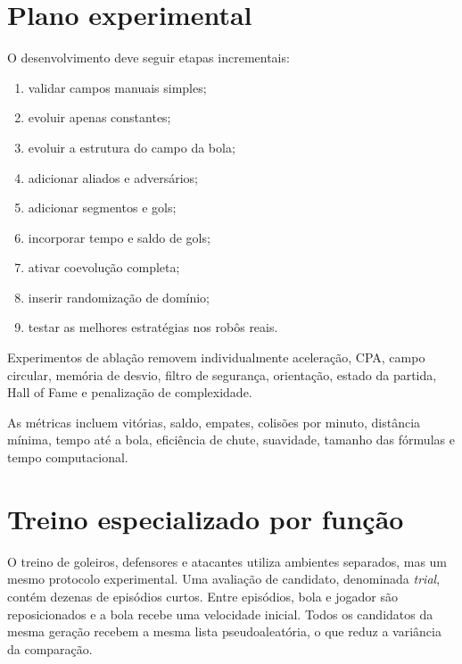 \documentclass[12pt,a4paper]{article}
\begin{document}
\section{Plano experimental}

O desenvolvimento deve seguir etapas incrementais:

\begin{enumerate}
  \item validar campos manuais simples;
  \item evoluir apenas constantes;
  \item evoluir a estrutura do campo da bola;
  \item adicionar aliados e advers\'arios;
  \item adicionar segmentos e gols;
  \item incorporar tempo e saldo de gols;
  \item ativar coevolu\c{c}\~ao completa;
  \item inserir randomiza\c{c}\~ao de dom\'inio;
  \item testar as melhores estrat\'egias nos rob\^os reais.
\end{enumerate}

Experimentos de abla\c{c}\~ao removem individualmente acelera\c{c}\~ao, CPA, campo circular, mem\'oria de desvio, filtro de seguran\c{c}a, orienta\c{c}\~ao, estado da partida, Hall of Fame e penaliza\c{c}\~ao de complexidade.

As m\'etricas incluem vit\'orias, saldo, empates, colis\~oes por minuto, dist\^ancia m\'inima, tempo at\'e a bola, efici\^encia de chute, suavidade, tamanho das f\'ormulas e tempo computacional.

\section{Treino especializado por fun\c{c}\~ao}

O treino de goleiros, defensores e atacantes utiliza ambientes separados, mas
um mesmo protocolo experimental. Uma avalia\c{c}\~ao de candidato, denominada
\textit{trial}, cont\'em dezenas de epis\'odios curtos. Entre epis\'odios, bola e
jogador s\~ao reposicionados e a bola recebe uma velocidade inicial. Todos os
candidatos da mesma gera\c{c}\~ao recebem a mesma lista pseudoaleat\'oria, o que
reduz a vari\^ancia da compara\c{c}\~ao.
\end{document}
